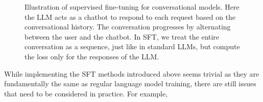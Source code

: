 \begin{figure}[!t]
\centering

\caption{Illustration of supervised fine-tuning for conversational models. Here the LLM acts as a chatbot to respond to each request based on the conversational history. The conversation progresses by alternating between the user and the chatbot. In SFT, we treat the entire conversation as a sequence, just like in standard LLMs, but compute the loss only for the responses of the LLM.}
\label{fig:sft-conversational-models}
\end{figure}

While implementing the SFT methods introduced above seems trivial as they are fundamentally the same as regular language model training, there are still issues that need to be considered in practice. For example,


